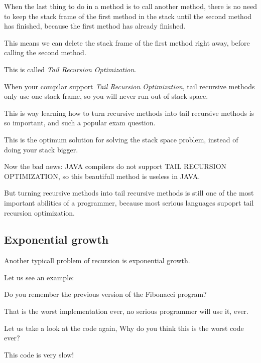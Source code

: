 \documentclass[a4paper, 9pt]{extarticle}
\begin{document}
When the last thing to do in a method is to call another method, there is no
need to keep the stack frame of the first method in the stack until the second
method has finished, because the first method has already finished.

This means we can delete the stack frame of the first method right away, before
calling the second method.

This is called \emph{Tail Recursion Optimization}.

When your compilar support \emph{Tail Recursion Optimization}, tail recursive
methods only use one stack frame, so you will never run out of stack space.

This is way learning how to turn recursive methods into tail recursive methods
is so important, and such a popular exam question.

This is the optimum solution for solving the stack space problem, instead of
doing your stack bigger.

Now the bad news: JAVA compilers do not support TAIL RECURSION OPTIMIZATION, so
this beautifull method is useless in JAVA.

But turning recursive methods into tail recursive methods is still one of the
most important abilities of a programmer, because most serious languages
supoprt tail recursion optimization.



\subsection{Exponential growth}

Another typicall problem of recursion is exponential growth.

Let us see an example:

Do you remember the previous version of the Fibonacci program?

That is the worst implementation ever, no serious programmer will use it, ever.

Let us take a look at the code again, Why do you think this is the worst code ever?


This code is very slow!

\end{document}

